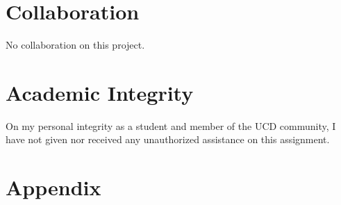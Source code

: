 \documentclass[a4paper,12pt]{article}
\begin{document}
\section{Collaboration}
No collaboration on this project.


\section{Academic Integrity}
On my personal integrity as a student and member of the UCD community, I have not given nor received any unauthorized assistance on this assignment.


\section{Appendix}


\end{document}
